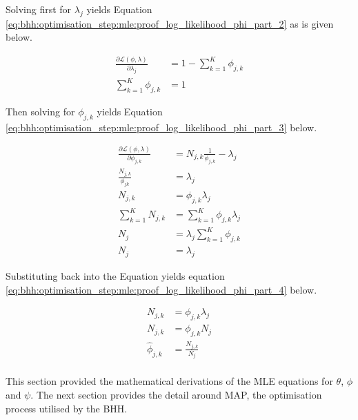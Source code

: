 Solving first for $\lambda_{j}$ yields Equation \ref{eq:bhh:optimisation_step:mle:proof_log_likelihood_phi_part_2} as is given below.

\begin{equation}
    \label{eq:bhh:optimisation_step:mle:proof_log_likelihood_phi_part_2}
    \begin{split}
        \frac{\partial \mathcal{L}(\phi, \lambda)}{\partial \lambda_{j}} &= 1 - \sum_{k=1}^{K} \phi_{j,k}  \\
        \sum_{k=1}^{K} \phi_{j,k}  &= 1
    \end{split}
\end{equation}

Then solving for $\phi_{j,k}$ yields Equation \ref{eq:bhh:optimisation_step:mle:proof_log_likelihood_phi_part_3} below.

\begin{equation}
    \label{eq:bhh:optimisation_step:mle:proof_log_likelihood_phi_part_3}
    \begin{split}
        \frac{\partial \mathcal{L}(\phi, \lambda)}{\partial \phi_{j,k}} &= N_{j,k} \frac{1}{\phi_{j,k}}  - \lambda_{j} \\
        \frac{N_{j,k}}{\phi_{jk}} &= \lambda_{j} \\
        N_{j,k} &= \phi_{j,k} \lambda_{j} \\
        \sum_{k=1}^{K} N_{j,k} &= \sum_{k=1}^{K} \phi_{j,k} \lambda_{j} \\
        N_{j} &= \lambda_{j} \sum_{k=1}^{K} \phi_{j,k} \\
        N_{j} &= \lambda_{j}
    \end{split}
\end{equation}

Substituting back into the Equation yields equation \ref{eq:bhh:optimisation_step:mle:proof_log_likelihood_phi_part_4} below.

\begin{equation}
    \label{eq:bhh:optimisation_step:mle:proof_log_likelihood_phi_part_4}
    \begin{split}
        N_{j,k} &= \phi_{j,k} \lambda_{j} \\
        N_{j,k} &= \phi_{j,k} N_{j} \\
        \hat{\phi}_{j,k} &= \frac{N_{j,k}}{N_{j}}\\
    \end{split}
\end{equation}

This section provided the mathematical derivations of the MLE equations for $\theta$, $\phi$ and $\psi$. The next section provides the detail around \ac{MAP}, the optimisation process utilised by the \ac{BHH}.

